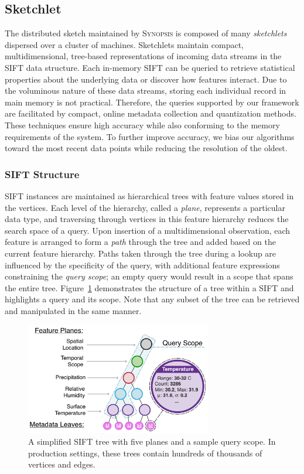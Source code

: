 \subsection{Sketchlet}
\label{sec:sketch}
The distributed sketch maintained by \textsc{Synopsis} is composed of many \emph{sketchlets} dispersed over a cluster of machines. Sketchlets maintain compact, multidimensional, tree-based representations of incoming data streams in the SIFT data structure. Each in-memory SIFT can be queried to retrieve statistical properties about the underlying data or discover how features interact. Due to the voluminous nature of these data streams, storing each individual record in main memory is not practical. Therefore, the queries supported by our framework are facilitated by compact, online metadata collection and quantization methods. These techniques ensure high accuracy while also conforming to the memory requirements of the system. To further improve accuracy, we bias our algorithms toward the most recent data points while reducing the resolution of the oldest.

\subsubsection{SIFT Structure}
\label{sec:sift}
SIFT instances are maintained as hierarchical trees with feature values stored in the vertices. Each level of the hierarchy, called a \emph{plane}, represents a particular data type, and traversing through vertices in this feature hierarchy reduces the search space of a query. Upon insertion of a multidimensional observation, each feature is arranged to form a \emph{path} through the tree and added based on the current feature hierarchy. Paths taken through the tree during a lookup are influenced by the specificity of the query, with additional feature expressions constraining the \emph{query scope}; an empty query would result in a scope that spans the entire tree. Figure~\ref{fig:sketch} demonstrates the structure of a tree within a SIFT and highlights a query and its scope. Note that any subset of the tree can be retrieved and manipulated in the same manner.

\begin{figure}[b!]
    \centerline{\includegraphics[width=3.2in]{figures/sketch.pdf}}
    \caption{A simplified SIFT tree with five planes and a sample query scope. In production settings, these trees contain hundreds of thousands of vertices and edges.}
    \label{fig:sketch}
\end{figure}

